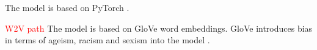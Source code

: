 \section{\infersent{}}\label{sec:impl-infersent}

The \infersent{} model is based on PyTorch \cite{HfsentTrans2019}.

\textcolor{red}{W2V path}
The \infersent{} model is based on GloVe word embeddings.
GloVe introduces bias in terms of ageism, racism and sexism into the model \cite{UniversalSentEnc2018}.